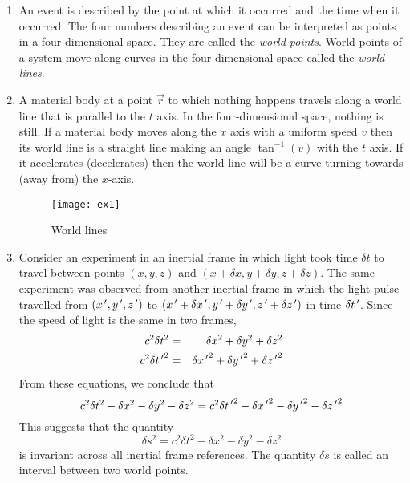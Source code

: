 \begin{enumerate}
\item An event is described by the point at which it occurred and the time when 
it occurred. The four numbers describing an event can be interpreted as points 
in a four-dimensional space. They are called the \emph{world points}. World 
points of a system move along curves in the four-dimensional space called the 
\emph{world lines}.

\item A material body at a point $\vec{r}$ to which nothing happens travels 
along a world line that is parallel to the $t$ axis. In the four-dimensional 
space, nothing is still. If a material body moves along the $x$ axis with a 
uniform speed $v$ then its world line is a straight line making an angle 
$\tan^{-1}(v)$ with the $t$ axis. If it accelerates (decelerates) then the 
world line will be a curve turning towards (away from) the $x$-axis. 
\begin{figure}
\texttt{[image: ex1]}
\caption{World lines}
\label{c1f1}
\end{figure}

\item Consider an experiment in an inertial frame in which light took time 
$\delta t$ to travel between points $(x, y, z)$ and $(x + \delta x, y + 
\delta y, z + \delta z)$. The same experiment was observed from another inertial 
frame in which the light pulse travelled from $(x^{\,\prime}, y^{\,\prime}, z^{\,\prime})$ to $(x^{\,\prime} 
+ \delta x^{\,\prime}, y^{\,\prime} + \delta y^{\,\prime}, z^{\,\prime} + \delta z^{\,\prime})$ in time $\delta 
t^{\,\prime}$.  Since the speed of light is the same in two frames,
\begin{eqnarray}
c^2\delta t^2 &=& \delta x^2 + \delta y^2 + \delta z^2 \label{c1e2} \\
c^2\delta {t^{\,\prime}}^2 &=& \delta {x^{\,\prime}}^2 + \delta {y^{\,\prime}}^2 + \delta {z^{\,\prime}}^2 
\label{c1e3}
\end{eqnarray}
From these equations, we conclude that
\begin{equation}\label{c1e4}
c^2\delta t^2 - \delta x^2 - \delta y^2 - \delta z^2 = 
c^2\delta {t^{\,\prime}}^2 - \delta {x^{\,\prime}}^2 - \delta {y^{\,\prime}}^2 - \delta {z^{\,\prime}}^2
\end{equation}
This suggests that the quantity 
\begin{equation}\label{c1e5}
\delta s^2 = c^2\delta t^2 - \delta x^2 - \delta y^2 - \delta z^2
\end{equation}
is invariant across all inertial frame references. The quantity $\delta s$ is
called an interval between two world points.


\end{enumerate}
